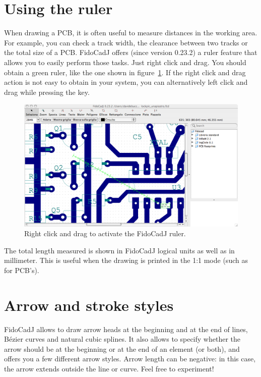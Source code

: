 \documentclass[10pt,a4paper,twoside]{scrreprt}
\newcommand{\keyevidence}[1]{\fbox{#1}}
\begin{document}
\section{Using the ruler}
When drawing a PCB, it is often useful to measure distances in the working area. For example, you can check a track width, the clearance between two tracks or the total size of a PCB. FidoCadJ offers (since version 0.23.2) a ruler feature that allows you to easily perform those tasks. Just right click and drag. You should obtain a green ruler, like the one shown in figure~\ref{fig_fidocadj_righello}. If the right click and drag action is not easy to obtain in your system, you can alternatively left click and drag while pressing the \keyevidence{Shift} key.
\begin{figure}
\includegraphics[width=\textwidth]{fidocadj_righello}
\caption{Right click and drag to activate the FidoCadJ ruler.}
\label{fig_fidocadj_righello}
\end{figure}
The total length measured is shown in FidoCadJ logical units as well as in millimeter. This is useful when the drawing is printed in the 1:1 mode (such as for PCB's).

\section{Arrow and stroke styles}
FidoCadJ allows to draw arrow heads at the beginning and at the end of lines, B\'ezier curves and natural cubic splines. It also allows to specify whether the arrow should be at the beginning or at the end of an element (or both), and offers you a few different arrow styles. Arrow length can be negative: in this case, the arrow extends outside the line or curve. Feel free to experiment!
\end{document}
